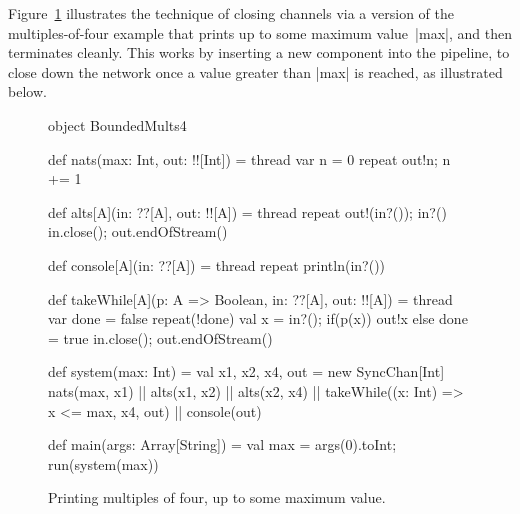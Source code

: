 Figure~\ref{fig:BoundedMults4} illustrates the technique of closing channels
via a version of the multiples-of-four example that prints up to some maximum
value~|max|, and then terminates cleanly.  This works by inserting a new
component into the pipeline, to close down the network once a value greater
than |max| is reached, as illustrated below.
%
\begin{center}
\end{center}


\begin{figure}
\begin{scala}
object BoundedMults4{
  def nats(max: Int, out: !![Int]) = thread{ 
    var n = 0
    repeat{ out!n; n += 1 }
  }

  def alts[A](in: ??[A], out: !![A]) = thread{ 
    repeat{ out!(in?()); in?() }
    in.close(); out.endOfStream()
  }

  def console[A](in: ??[A]) = thread{ repeat{ println(in?()) } }

  def takeWhile[A](p: A => Boolean, in: ??[A], out: !![A]) = thread{
    var done = false
    repeat(!done){ 
      val x = in?(); if(p(x)) out!x else done = true
    }
    in.close(); out.endOfStream()
  }

  def system(max: Int) = {
    val x1, x2, x4, out = new SyncChan[Int]
    nats(max, x1) || alts(x1, x2) || alts(x2, x4) || 
      takeWhile((x: Int) => x <= max, x4, out) || console(out)
  }

  def main(args: Array[String]) = {
    val max = args(0).toInt; run(system(max))
  }
}
\end{scala}
\caption{Printing multiples of four, up to some maximum value.}
\label{fig:BoundedMults4}
\end{figure}

